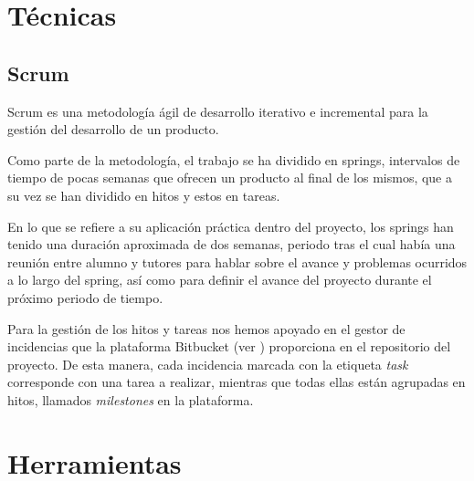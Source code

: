 

\section{Técnicas}
\subsection{Scrum}

Scrum es una metodología ágil de desarrollo iterativo e incremental para la gestión del desarrollo de un producto. \cite{wikiScrum} 

Como parte de la metodología, el trabajo se ha dividido en springs, intervalos de tiempo de pocas semanas que ofrecen un producto al final de los mismos, que a su vez se han dividido en hitos y estos en tareas.

En lo que se refiere a su aplicación práctica dentro del proyecto, los springs han tenido una duración aproximada de dos semanas, periodo tras el cual había una reunión entre alumno y tutores para hablar sobre el avance y problemas ocurridos a lo largo del spring, así como para definir el avance del proyecto durante el próximo periodo de tiempo.

Para la gestión de los hitos y tareas nos hemos apoyado en el gestor de incidencias que la plataforma Bitbucket (ver ) proporciona en el repositorio del proyecto. De esta manera, cada incidencia marcada con la etiqueta \textit{task} corresponde con una tarea a realizar, mientras que todas ellas están agrupadas en hitos, llamados \textit{milestones} en la plataforma.

\section{Herramientas}

